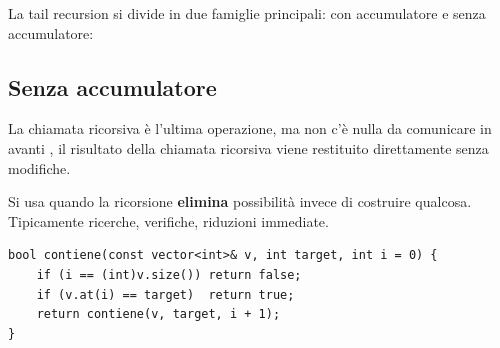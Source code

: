 La tail recursion si divide in due famiglie principali: con accumulatore e senza accumulatore:

\subsection{Senza accumulatore}
La chiamata ricorsiva è  l'ultima operazione, ma non c'è nulla da comunicare in avanti ,  il risultato della chiamata ricorsiva viene restituito direttamente senza modifiche.

Si usa quando la ricorsione \textbf{elimina} possibilità invece di costruire qualcosa. Tipicamente ricerche, verifiche, riduzioni immediate. 


\begin{codeexample}

  \begin{codebox}
    \begin{lstlisting}
bool contiene(const vector<int>& v, int target, int i = 0) {
    if (i == (int)v.size()) return false;
    if (v.at(i) == target)  return true;
    return contiene(v, target, i + 1);
}
    \end{lstlisting}
  \end{codebox}

\end{codeexample}









